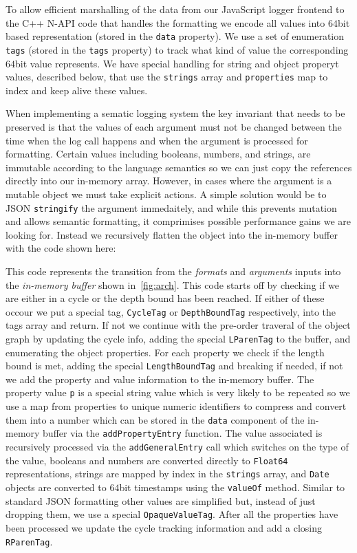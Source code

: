 To allow efficient marshalling of the data from our JavaScript logger frontend 
to the C++ N-API code that handles the formatting we encode all values into 
$64$bit based representation (stored in the \texttt{data} property). We use a set 
of enumeration \texttt{tags} (stored in the \texttt{tags} property) to track 
what kind of value the corresponding $64$bit value represents. We have special 
handling for string and object properyt values, described below, that use the 
\texttt{strings} array and \texttt{properties} map to index and keep alive these values.

When implementing a sematic logging system the key invariant that needs to be 
preserved is that the values of each argument must not be changed between the 
time when the log call happens and when the argument is processed for 
formatting. Certain values including booleans, numbers, and strings, are 
immutable according to the language semantics so we can just copy the 
references directly into our in-memory array. However, in cases where the 
argument is a mutable object we must take explicit actions. A simple solution 
would be to JSON \texttt{stringify} the argument immedaitely, and while this 
prevents mutation and allows semantic formatting, it comprimises possible 
performance gains we are looking for. Instead we recursively flatten the object 
into the in-memory buffer with the code shown here:



This code represents the transition from the \emph{formats} and \emph{arguments} 
inputs into the \emph{in-memory buffer} shown in~\autoref{fig:arch}. This code 
starts off by checking if we are either in a cycle or the depth bound has been 
reached. If either of these occour we put a special tag, \texttt{CycleTag} or 
\texttt{DepthBoundTag} respectively, into the tags array and return. If not we 
continue with the pre-order traveral of the object graph by updating the cycle 
info, adding the special \texttt{LParenTag} to the buffer, and enumerating the 
object properties. For each property we check if the length bound is met, adding 
the special \texttt{LengthBoundTag} and breaking if needed, if not we add the 
property and value information to the in-memory buffer. The property value \texttt{p} 
is a special string value which is very likely to be repeated so we use a map 
from properties to unique numeric identifiers to compress and convert them into 
a number which can be stored in the \texttt{data} component of the in-memory buffer 
via the \texttt{addPropertyEntry} function. The value associated is recursively 
processed via the \texttt{addGeneralEntry} call which switches on the type of the 
value, booleans and numbers are converted directly to \texttt{Float64} representations, 
strings are mapped by index in the \texttt{strings} array, and \texttt{Date} objects 
are converted to $64$bit timestamps using the \texttt{valueOf} method. Similar to 
standard JSON formatting other values are simplified but, instead of just dropping 
them, we use a special \texttt{OpaqueValueTag}. After all the properties have 
been processed we update the cycle tracking information and add a closing 
\texttt{RParenTag}.

